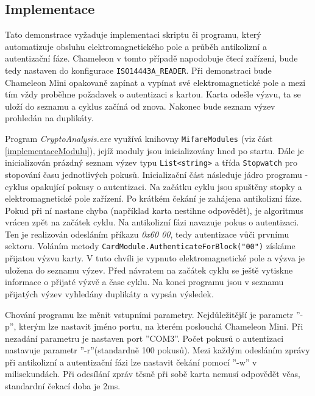 \subsection{Implementace}
Tato demonstrace vyžaduje implementaci skriptu či programu, který automatizuje obsluhu elektromagnetického pole a průběh antikolizní a autentizační fáze. Chameleon v tomto případě napodobuje čtecí zařízení, bude tedy nastaven do konfigurace \verb|ISO14443A_READER|. Při demonstraci bude Chameleon Mini opakovaně zapínat a vypínat své elektromagnetické pole a mezi tím vždy proběhne požadavek o autentizaci s kartou. Karta odešle výzvu, ta se uloží do seznamu a cyklus začíná od znova. Nakonec bude seznam výzev prohledán na duplikáty.\par
Program \emph{CryptoAnalysis.exe} využívá knihovny \verb|MifareModules| (viz část \ref{implementaceModulu}), jejíž moduly jsou inicializovány hned po startu. Dále je inicializován prázdný seznam výzev typu \verb|List<string>| a třída \verb|Stopwatch| pro stopování času jednotlivých pokusů. Inicializační část následuje jádro programu - cyklus opakující pokusy o autentizaci. Na začátku cyklu jsou spuštěny stopky a elektromagnetické pole zařízení. Po krátkém čekání je zahájena antikolizní fáze. Pokud při ní nastane chyba (například karta nestihne odpovědět), je algoritmus vrácen zpět na začátek cyklu. Na antikolizní fázi navazuje pokus o autentizaci. Ten je realizován odesláním příkazu \emph{0x60 00}, tedy autentizace vůči prvnímu sektoru. Voláním metody \verb|CardModule.AuthenticateForBlock("00")| získáme přijatou výzvu karty. V tuto chvíli je vypnuto elektromagnetické pole a výzva je uložena do seznamu výzev. Před návratem na začátek cyklu se ještě vytiskne informace o přijaté výzvě a čase cyklu. Na konci programu jsou v seznamu přijatých výzev vyhledány duplikáty a vypsán výsledek. \par
Chování programu lze měnit vstupními parametry. Nejdůležitější je parametr ''-p'', kterým lze nastavit jméno portu, na kterém poslouchá Chameleon Mini. Při nezadání parametru je nastaven port ''COM3''. Počet pokusů o autentizaci nastavuje parametr ''-r''(standardně 100 pokusů). Mezi každým odesláním zprávy při antikolizní a autentizační fázi lze nastavit čekání pomocí ''-w'' v milisekundách. Při odesílání zpráv těsně při sobě karta nemusí odpovědět včas, standardní čekací doba je 2ms. 

